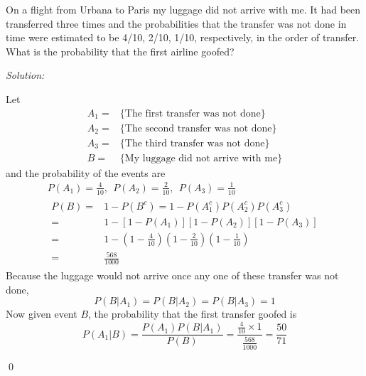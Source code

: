 \documentclass[12pt]{article}
\newenvironment{problem}[2][Problem]{\begin{trivlist}
\item[\hskip \labelsep {\bfseries #1}\hskip \labelsep {\bfseries #2.}]}{\end{trivlist}}
\newenvironment{sol}
    {\emph{Solution:}
    }
    {
    \qed
    }
\begin{document}




\begin{problem}{1} 
On a flight from Urbana to Paris my luggage did not arrive with me. It
had been transferred three times and the probabilities that the transfer
was not done in time were estimated to be 4/10, 2/10, 1/10, respectively, in the order of transfer. What is the probability that the first
airline goofed?
\end{problem}
\begin{sol}
Let
\begin{align*}
A_1=&\{\text{The first transfer was not done}\}\\
A_2=&\{\text{The second transfer was not done}\}\\
A_3=&\{\text{The third transfer was not done}\}\\
B=&\{\text{My luggage did not arrive with me}\}
\end{align*}
and the probability of the events are
\begin{gather*}
P(A_1)=\frac{4}{10},~~P(A_2)=\frac{2}{10},~~P(A_3)=\frac{1}{10}\\
\begin{align*}
P(B)=&1-P(B^c)=1-P(A_1^c)P(A_2^c)P(A_3^c)\\
=&1-[1-P(A_1)][1-P(A_2)][1-P(A_3)]\\
=&1-(1-\frac{4}{10})(1-\frac{2}{10})(1-\frac{1}{10})\\
=&\frac{568}{1000}
\end{align*}
\end{gather*}
Because the luggage would not arrive once any one of these transfer was not done,
\[
P(B|A_1)=P(B|A_2)=P(B|A_3)=1
\]
Now given event $B$, the probability that the first transfer goofed is
\[
P(A_1|B)=\frac{P(A_1)P(B|A_1)}{P(B)}=\frac{\frac{4}{10}\times1}{\frac{568}{1000}}=\frac{50}{71}
\]
\end{sol}
\end{document}
